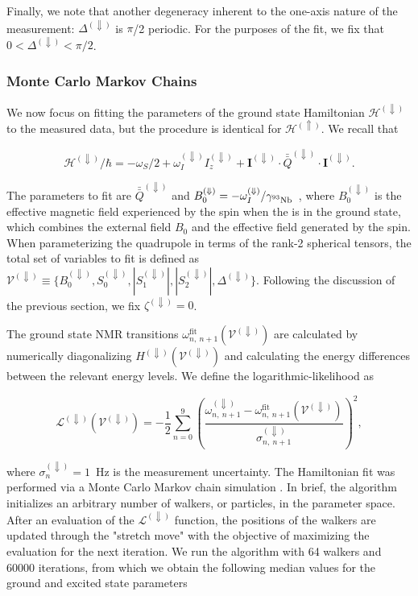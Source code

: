 Finally, we note that another degeneracy inherent to the one-axis nature of the measurement: $\Delta^{(\Downarrow)}$ is $\pi$/2 periodic. For the purposes of the fit, we fix that $0 <\Delta^{(\Downarrow)} < \pi/2$.

\subsubsection{Monte Carlo Markov Chains}

We now focus on fitting the parameters of the ground state Hamiltonian $\mathcal{H}^{(\Downarrow)}$ to the measured data, but the procedure is identical for $\mathcal{H}^{(\Uparrow)}$. We recall that 

\begin{equation}
    \mathcal{H}^{(\Downarrow)}/\hbar = -\omega_S / 2 + \omega_I^{(\Downarrow)} I_z^{(\Downarrow)} + \mathbf{I^{(\Downarrow)}}\cdot \bar{\bar{Q}}^{(\Downarrow)}\cdot \mathbf{I^{(\Downarrow)}}.
\end{equation}

The parameters to fit are $\bar{\bar{Q}}^{(\Downarrow)}$ and $B^{(\Downarrow)}_0 = - \omega_I^{(\Downarrow)} / \gamma_\text{$^{93}$Nb\,}$ , where $B^{(\Downarrow)}_0$ is the effective magnetic field experienced by the \Nb spin when the \Er is in the ground state, which combines the external field $B_0$ and the effective field generated by the \Er spin. When parameterizing the quadrupole in terms of the rank-2 spherical tensors, the total set of variables to fit is defined as $\mathcal{V^{(\Downarrow)}} \equiv\{B^{(\Downarrow)}_0, S^{(\Downarrow)}_0, |S^{(\Downarrow)}_1|, |S^{(\Downarrow)}_2|, \Delta^{(\Downarrow)}\}$. Following the discussion of the previous section, we fix $\zeta^{(\Downarrow)}=0$.

The ground state NMR transitions $\omega_{n,\ n+1}^{\text{fit}}(\mathcal{V^{(\Downarrow)}})$ are calculated by numerically diagonalizing $H^{(\Downarrow)}(\mathcal{V}^{(\Downarrow)})$ and calculating the energy differences between the relevant energy levels. We define the logarithmic-likelihood as

\begin{equation}
    \mathcal{L}^{(\Downarrow)}(\mathcal{V}^{(\Downarrow)}) = -\frac{1}{2}\sum_{n=0}^9 \left(\frac{\omega^{(\Downarrow)}_{n, \ n+1} - \omega_{n, \ n+1}^{\text{fit}}(\mathcal{V^{(\Downarrow)}})}{\sigma^{(\Downarrow)}_{n, \ n+1}}\right)^2,
\end{equation}

where $\sigma^{(\Downarrow)}_n=1$~Hz is the measurement uncertainty. The Hamiltonian fit was performed via a Monte Carlo Markov chain simulation . In brief, the algorithm initializes an arbitrary number of walkers, or particles, in the parameter space. After an evaluation of the $\mathcal{L}^{(\Downarrow)}$ function, the positions of the walkers are updated through the "stretch move"  with the objective of maximizing the evaluation for the next iteration. We run the algorithm with 64 walkers and 60000 iterations, from which we obtain the following median values for the ground and excited state parameters

